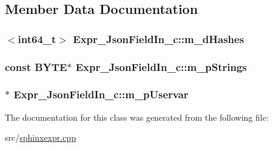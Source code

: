 \subsection{Member Data Documentation}
\hypertarget{classExpr__JsonFieldIn__c_a48fbe6751884fbbdb69389664bcc30a2}{
\subsubsection[{m\-\_\-d\-Hashes}]{$<${\bf int64\-\_\-t}$>$ Expr\-\_\-\-Json\-Field\-In\-\_\-c\-::m\-\_\-d\-Hashes\hspace{0.3cm}{\ttfamily [protected]}}}\label{classExpr__JsonFieldIn__c_a48fbe6751884fbbdb69389664bcc30a2}
\hypertarget{classExpr__JsonFieldIn__c_aa8d184c2f9e484c188f4418f365ee61e}{
\subsubsection[{m\-\_\-p\-Strings}]{\setlength{\rightskip}{0pt plus 5cm}const {\bf B\-Y\-T\-E}$\ast$ Expr\-\_\-\-Json\-Field\-In\-\_\-c\-::m\-\_\-p\-Strings\hspace{0.3cm}{\ttfamily [protected]}}}\label{classExpr__JsonFieldIn__c_aa8d184c2f9e484c188f4418f365ee61e}
\hypertarget{classExpr__JsonFieldIn__c_a98af7bd2703d8e0c3aa62f4fdda5404d}{
\subsubsection[{m\-\_\-p\-Uservar}]{$\ast$ Expr\-\_\-\-Json\-Field\-In\-\_\-c\-::m\-\_\-p\-Uservar\hspace{0.3cm}{\ttfamily [protected]}}}\label{classExpr__JsonFieldIn__c_a98af7bd2703d8e0c3aa62f4fdda5404d}


The documentation for this class was generated from the following file\-:\begin{DoxyCompactItemize}
\item 
src/\hyperlink{sphinxexpr_8cpp}{sphinxexpr.\-cpp}\end{DoxyCompactItemize}
